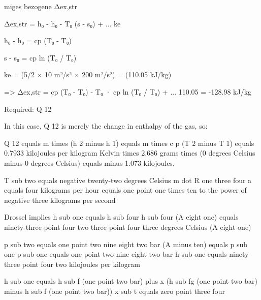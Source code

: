 miges bezogene Δex,str

Δex,str = h₀ - h₀ - T₀ (s - s₀) + ... ke

h₀ - h₀ = cp (T₀ - T₀)

s - s₀ = cp ln (T₀ / T₀)

ke = (5/2 × 10 m²/s² × 200 m²/s²) = (110.05 kJ/kg)

=> Δex,str = cp (T₀ - T₀) - T₀ · cp ln (T₀ / T₀) + ... 110.05 = -128.98 kJ/kg

Required: Q 12

In this case, Q 12 is merely the change in enthalpy of the gas, so:

Q 12 equals m times (h 2 minus h 1) equals m times c p (T 2 minus T 1) equals 0.7933 kilojoules per kilogram Kelvin times 2.686 grams times (0 degrees Celsius minus 0 degrees Celsius) equals minus 1.073 kilojoules.

T sub two equals negative twenty-two degrees Celsius  
m dot R one three four a equals four kilograms per hour equals one point one times ten to the power of negative three kilograms per second  

Drossel implies h sub one equals h sub four  
h sub four (A eight one) equals ninety-three point four two  
three point four three degrees Celsius (A eight one)  

p sub two equals one point two nine eight two bar (A minus ten) equals p sub one  
p sub one equals one point two nine eight two bar  
h sub one equals ninety-three point four two kilojoules per kilogram  

h sub one equals h sub f (one point two bar) plus x (h sub fg (one point two bar) minus h sub f (one point two bar))  
x sub t equals zero point three four
